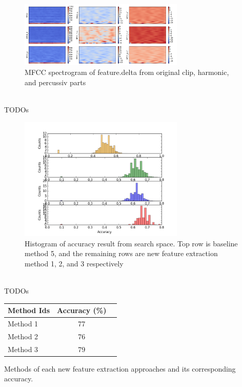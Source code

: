 \documentclass[final]{siamltexmm}
\begin{document}
\begin{figure}[!ht]
  \centering
    \includegraphics[width=0.7\textwidth]{../fig/HP_deltas1.png}
  \caption{MFCC spectrogram of feature.delta from original clip, harmonic, and percussiv parts}
\end{figure}

\\TODOs

\begin{figure}[!ht]
  \centering
    \includegraphics[width=0.7\textwidth]{../fig/histogram_n1.png}
  \caption{Histogram of accuracy result from search space. Top row is baseline method 5, and the remaining rows are new feature extraction method 1, 2, and 3 respectively}
\end{figure}

\\TODOs

\begin{center}
  \begin{tabular}{ l || c | r }
    \hline
    Method Ids & Accuracy (\%) \\ \hline \hline
    Method 1 & 77 \\ \hline
    Method 2 & 76 \\ \hline
    Method 3 & 79 \\ \hline
    \hline
  \end{tabular}
  \begin{tablenotes}
    \small
    \item Methods of each new feature extraction approaches and its corresponding accuracy.
  \end{tablenotes}
\end{center}
\end{document}
